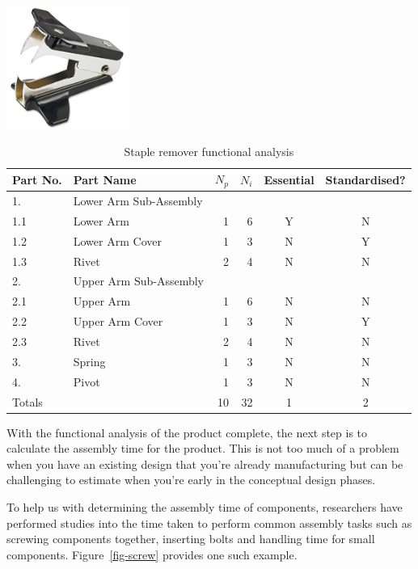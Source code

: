 \begin{table}[h!]
    \centering
    \includegraphics[width=0.3\textwidth]{07_design_for_x/staple-remover.jpg} \\
    \footnotesize
    \begin{tabular}{l l r r c c}
        \toprule
          Part No. & Part Name & $N_p$ & $N_i$ & Essential &Standardised? \\
        \midrule
          1. & Lower Arm Sub-Assembly \\
        \midrule
          1.1 & Lower Arm & 1 & 6 & Y & N \\
          1.2 & Lower Arm Cover & 1 & 3 & N & Y \\
          1.3 & Rivet & 2 & 4 & N & N \\
        \midrule
          2. & Upper Arm Sub-Assembly & & \\
        \midrule
          2.1 & Upper Arm & 1 & 6 & N & N \\
          2.2 & Upper Arm Cover & 1 & 3 & N & Y \\
          2.3 & Rivet & 2 & 4 & N & N \\
        \midrule
          3. & Spring & 1 & 3 & N & N \\
        \midrule
          4. & Pivot & 1 & 3 & N & N \\
        \midrule
          Totals & & 10 & 32 & 1 & 2 \\
        \bottomrule
    \end{tabular}
    \caption{Staple remover functional analysis}\label{tbl-parts}
\end{table}


With the functional analysis of the product complete, the next step is to calculate the assembly time for the product. This is not too much of a problem when you have an existing design that you're already manufacturing but can be challenging to estimate when you're early in the conceptual design phases.

To help us with determining the assembly time of components, researchers have performed studies into the time taken to perform common assembly tasks such as screwing components together, inserting bolts and handling time for small components. Figure~\ref{fig-screw} provides one such example.

